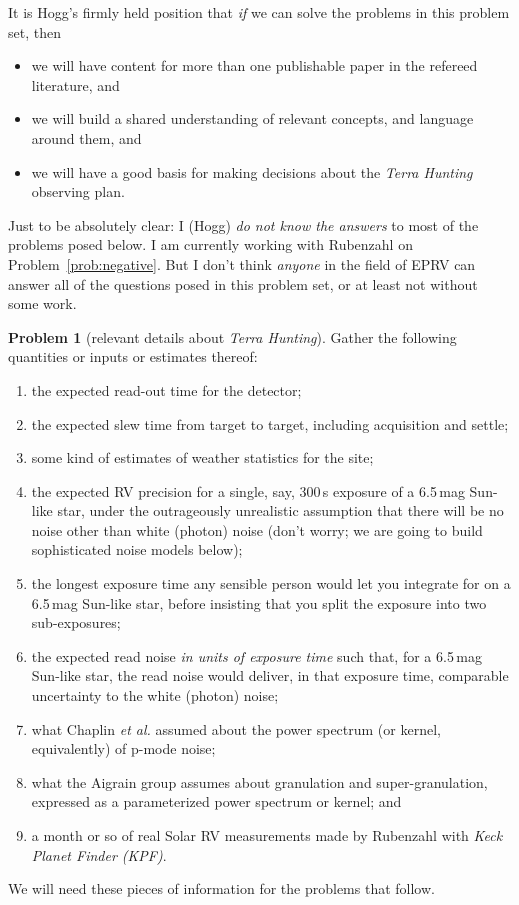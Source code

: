 \documentclass{article}
\theoremstyle{definition}
\newcommand{\problemname}{Problem}
\newtheorem{problem}{\problemname}
\newcommand{\probref}[1]{\problemname~\ref{#1}}
\theoremstyle{remark}
\begin{document}
It is Hogg's firmly held position that \emph{if} we can solve the problems in this problem set, then
\begin{itemize}
\item we will have content for more than one publishable paper in the refereed literature, and
\item we will build a shared understanding of relevant concepts, and language around them, and
\item we will have a good basis for making decisions about the \textsl{Terra Hunting} observing plan.
\end{itemize}
Just to be absolutely clear: I (Hogg) \emph{do not know the answers} to most of the problems posed below.
I am currently working with Rubenzahl on \probref{prob:negative}.
But I don't think \emph{anyone} in the field of EPRV can answer all of the questions posed in this problem set, or at least not without some work.

\begin{problem}[relevant details about \textsl{Terra Hunting}]\label{prob:gather}
Gather the following quantities or inputs or estimates thereof:
\begin{enumerate}
    \item the expected read-out time for the detector;
    \item the expected slew time from target to target, including acquisition and settle;
    \item some kind of estimates of weather statistics for the site;
    \item the expected RV precision for a single, say, 300\,s exposure of a 6.5\,mag Sun-like star, under the outrageously unrealistic assumption that there will be no noise other than white (photon) noise (don't worry; we are going to build sophisticated noise models below);
    \item the longest exposure time any sensible person would let you integrate for on a 6.5\,mag Sun-like star, before insisting that you split the exposure into two sub-exposures;
    \item the expected read noise \emph{in units of exposure time} such that, for a 6.5\,mag Sun-like star, the read noise would deliver, in that exposure time, comparable uncertainty to the white (photon) noise;
    \item what Chaplin \textsl{et al.} \cite{chaplin} assumed about the power spectrum (or kernel, equivalently) of p-mode noise;
    \item what the Aigrain group assumes about granulation and super-granulation, expressed as a parameterized power spectrum or kernel; and
    \item a month or so of real Solar RV measurements made by Rubenzahl with \textsl{Keck Planet Finder (KPF)}.
\end{enumerate}
We will need these pieces of information for the problems that follow.
\end{problem}
\end{document}
